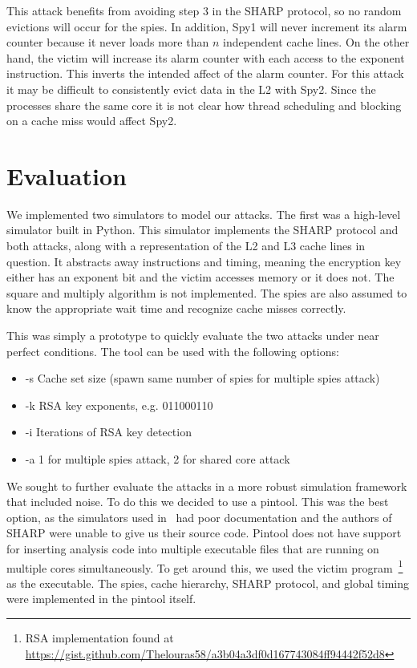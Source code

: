 \documentclass[12pt]{article}
\begin{document}
This attack benefits from avoiding step $3$ in the SHARP protocol, so no random evictions will occur for the spies.
In addition, Spy1 will never increment its alarm counter because it never loads more than $n$ independent cache lines.
On the other hand, the victim will increase its alarm counter with each access to the exponent instruction.
This inverts the intended affect of the alarm counter.
For this attack it may be difficult to consistently evict data in the L2 with Spy2.
Since the processes share the same core it is not clear how thread scheduling and blocking on a cache miss would affect Spy2.

\section{Evaluation}

We implemented two simulators to model our attacks.
The first was a high-level simulator built in Python.
This simulator implements the SHARP protocol and both attacks, along with a representation of the L2 and L3 cache lines in question.
It abstracts away instructions and timing, meaning the encryption key either has an exponent bit and the victim accesses memory or it does not.
The square and multiply algorithm is not implemented.
The spies are also assumed to know the appropriate wait time and recognize cache misses correctly.

This was simply a prototype to quickly evaluate the two attacks under near perfect conditions.
The tool can be used with the following options:

\begin{itemize}
\item -s  Cache set size (spawn same number of spies for multiple spies attack)
\item -k  RSA key exponents, e.g. 011000110
\item -i  Iterations of RSA key detection
\item -a 1 for multiple spies attack, 2 for shared core attack
\end{itemize}

We sought to further evaluate the attacks in a more robust simulation framework that included noise.
To do this we decided to use a pintool.
This was the best option, as the simulators used in~\cite{sharp,howSharp} had poor documentation and the authors of SHARP were unable to give us their source code.
Pintool does not have support for inserting analysis code into multiple executable files that are running on multiple cores simultaneously. 
To get around this, we used the victim program~\footnote{RSA implementation found at \\\url{https://gist.github.com/Thelouras58/a3b04a3df0d167743084ff94442f52d8}} as the executable.
The spies, cache hierarchy, SHARP protocol, and global timing were implemented in the pintool itself.
\end{document}
